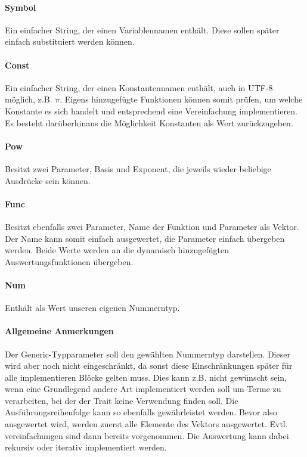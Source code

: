 \documentclass[11pt,a4paper, ngerman]{article}
\begin{document}
\paragraph{Symbol} Ein einfacher String, der einen Variablennamen enthält. Diese sollen später einfach substituiert werden können.

\paragraph{Const} Ein einfacher String, der einen Konstantennamen enthält, auch in UTF-8 möglich, z.B. $\pi$. Eigens hinzugefügte Funktionen können somit prüfen, um welche Konstante es sich handelt und entsprechend eine Vereinfachung implementieren. Es besteht darüberhinaus die Möglichkeit Konstanten als Wert zurückzugeben.

\paragraph{Pow} Besitzt zwei Parameter, Basis und Exponent, die jeweils wieder beliebige Ausdrücke sein können.

\paragraph{Func} Besitzt ebenfalls zwei Parameter, Name der Funktion und Parameter als Vektor. Der Name kann somit einfach ausgewertet, die Parameter einfach übergeben werden. Beide Werte werden an die dynamisch hinzugefügten Auswertungsfunktionen übergeben.

\paragraph{Num} Enthält als Wert unseren eigenen Nummerntyp.

\paragraph{Allgemeine Anmerkungen} Der Generic-Typparameter  soll den gewählten Nummerntyp darstellen. Dieser wird aber noch nicht eingeschränkt, da sonst diese Einschränkungen später für alle implementieren Blöcke gelten muss. Dies kann z.B. nicht gewünscht sein, wenn eine Grundlegend andere Art implementiert werden soll um Terme zu verarbeiten, bei der der Trait  keine Verwendung finden soll. Die Ausführungsreihenfolge kann so ebenfalls gewährleistet werden. Bevor also  ausgewertet wird, werden zuerst alle Elemente des Vektors ausgewertet. Evtl. vereinfachungen sind dann bereits vorgenommen. Die Auswertung kann dabei rekursiv oder iterativ implementiert werden.
\end{document}
